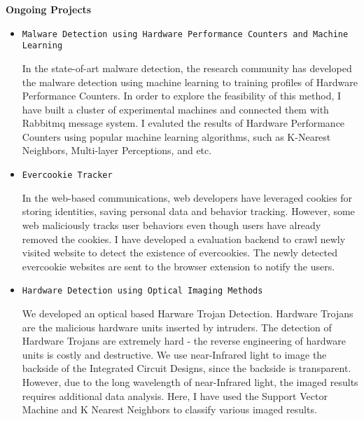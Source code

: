 \documentclass[]{article}
\begin{document}
\noindent \textbf{Ongoing Projects}
\begin{itemize}

		\item \verb+Malware Detection using Hardware Performance Counters and Machine Learning+

In the state-of-art malware detection, the research community has developed the
malware detection using machine learning to training profiles of Hardware
Performance Counters. In order to explore the feasibility of this method,  I
have built a cluster of experimental machines and connected them with Rabbitmq
message system. I evaluted the results of Hardware Performance Counters using
popular machine learning algorithms, such as K-Nearest Neighbors, Multi-layer
Perceptions, and etc.

		\item \verb+Evercookie Tracker+

In the web-based communications, web developers have leveraged cookies for
storing identities, saving personal data and behavior tracking. However, some
web maliciously tracks user behaviors even though users have already removed
the cookies. I have developed a evaluation backend to crawl newly visited
website to detect the existence of evercookies. The newly detected evercookie
websites are sent to the browser extension to notify the users.

		\item \verb+Hardware Detection using Optical Imaging Methods+

We developed an optical based Harware Trojan Detection. Hardware Trojans are the malicious
hardware units inserted by intruders. The detection of Hardware Trojans are extremely hard -
the reverse engineering of hardware units is costly and destructive. We use near-Infrared light 
to image the backside of the Integrated Circuit Designs, since the backside is transparent. 
However, due to the long wavelength of near-Infrared light, the imaged results requires additional
data analysis. Here, I have used the Support Vector Machine and K Nearest Neighbors to classify 
various imaged results.
		
\end{itemize}
\end{document}
